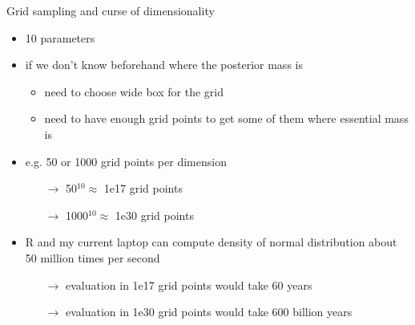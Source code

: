 \documentclass[english,t]{beamer}
\begin{document}
\begin{frame}{Grid sampling and curse of dimensionality}

  \begin{itemize}
      \item 10 parameters
      \item if we don't know beforehand where the posterior mass is
        \begin{itemize}
          \item need to choose wide box for the grid
          \item need to have enough grid points to get some of them
            where essential mass is
        \end{itemize}
      \item e.g. 50 or 1000 grid points per dimension
        \begin{itemize}
        \item[$\rightarrow$] 50$^{10} \approx$ 1e17 grid points
        \item[$\rightarrow$] 1000$^{10} \approx$ 1e30 grid points
        \end{itemize}
      \item R and my current laptop can compute density of normal
        distribution about 50 million times per second
        \begin{itemize}
        \item[$\rightarrow$] evaluation in 1e17 grid points would take
           60 years %
        \item[$\rightarrow$] evaluation in 1e30 grid points would take
           600 billion years %
        \end{itemize}
 \end{itemize}

\end{frame}
\end{document}
